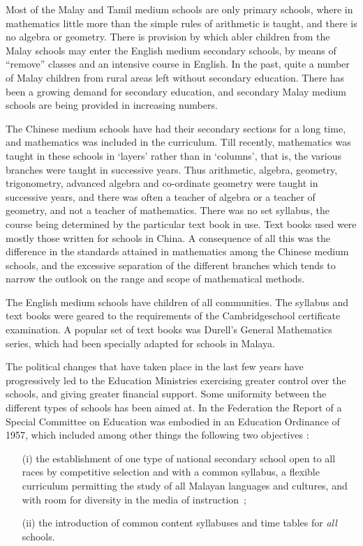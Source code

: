 Most of the Malay and Tamil medium schools are only primary schools,
where in mathematics little more than the simple rules of arithmetic
is taught, and there is no algebra or geometry. There is provision by
which abler children from the Malay schools may enter the English
medium secondary schools, by means of ``remove'' classes and an
intensive course in English. In the past, quite a number of Malay
children from rural areas left without secondary education. There has
been a growing demand for secondary education, and secondary Malay
medium schools are being provided in increasing numbers.

The Chinese medium schools have had their secondary sections for a
long time, and mathematics was included in the curriculum. Till
recently, mathematics was taught in these schools in `layers' rather
than in `columns', that is, the various branches were taught in
successive years. Thus arithmetic, algebra, geometry, trigonometry,
advanced algebra and co-ordinate geometry were taught in successive
years, and there was often a teacher of algebra or a teacher of
geometry, and not a teacher of mathematics. There was no set syllabus,
the course being determined by the particular text book in use. Text
books used were mostly those written for schools in China. A
consequence of all this was the difference in the standards attained
in mathematics among the Chinese medium schools, and the excessive
separation of the different branches which tends to narrow the outlook
on the range and scope of mathematical methods.

The English medium schools have children of all communities. The
syllabus and text books were geared to the requirements of the
Cambridge\pageoriginale school certificate examination. A popular set
of text books was Durell's General Mathematics series, which had been
specially adapted for schools in Malaya. 

The political changes that have taken place in the last few years have
progressively led to the Education Ministries exercising greater
control over the schools, and giving greater financial support. Some
uniformity between the different types of schools has been aimed
at. In the Federation the Report of a Special Committee on Education
was embodied in an Education Ordinance of 1957, which included among
other things the following two objectives :
\begin{itemize}
\item[(i)] the establishment of one type of national secondary school
  open to all races by competitive selection and with a common
  syllabus, a flexible curriculum permitting the study of all Malayan
  languages and cultures, and with room for diversity in the media of
  instruction~; 

\item[(ii)] the introduction of common content syllabuses and time
  tables for \textit{all} schools.
\end{itemize}

